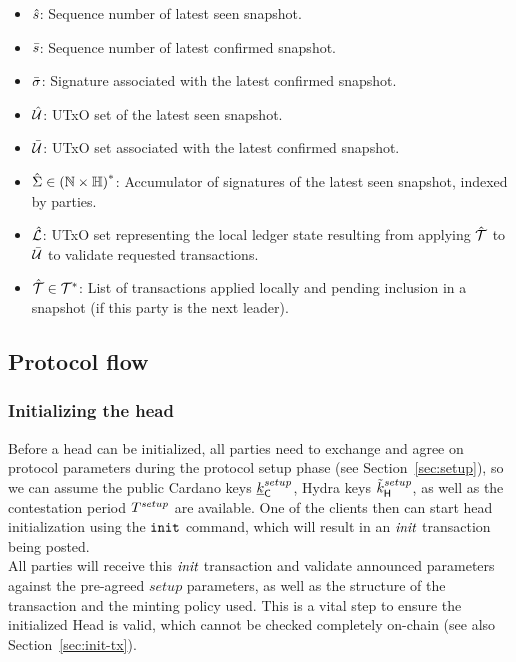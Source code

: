 \begin{itemize}
	\item $\hat s$: Sequence number of latest seen snapshot.
	\item $\bar s$: Sequence number of latest confirmed snapshot.
	\item $\bar{\sigma}$: Signature associated with the latest confirmed snapshot.
	\item $\hat {\mathcal U}$: UTxO set of the latest seen snapshot.
	\item $\bar {\mathcal U}$: UTxO set associated with the latest confirmed snapshot.
	\item $\hat{\Sigma} \in {(\mathbb{N}\times \mathbb{H})}^{*}$: Accumulator of
	      signatures of the latest seen snapshot, indexed by parties.
	\item $\hat {\mathcal L}$: UTxO set representing the local ledger state resulting from
	      applying $\hat {\mathcal T}$ to $\bar {\mathcal U}$ to validate requested transactions.
	\item $\hat {\mathcal T} \in {\mathcal T}^{*}$: List of transactions applied locally and pending
	      inclusion in a snapshot (if this party is the next leader).
\end{itemize}

\subsection{Protocol flow}

\subsubsection{Initializing the head}

\quad Before a head can be initialized, all parties need
to exchange and agree on protocol parameters during the protocol setup phase
(see Section~\ref{sec:setup}), so we can assume the public Cardano keys
$\underline{k}_\mathsf{C}^{setup}$, Hydra keys $\tilde{k}_{\mathsf{H}}^{setup}$, as well as the
contestation period $T^{setup}$ are available. One of the clients then can
start head initialization using the $\mathtt{init}$ command, which will result in an
$\textit{init}$ transaction being posted. \\

\quad All parties will receive this $\textit{init}$
transaction and validate announced parameters against the pre-agreed $setup$
parameters, as well as the structure of the transaction and the minting policy
used. This is a vital step to ensure the initialized Head is valid, which
cannot be checked completely on-chain (see also Section~\ref{sec:init-tx}). \\

